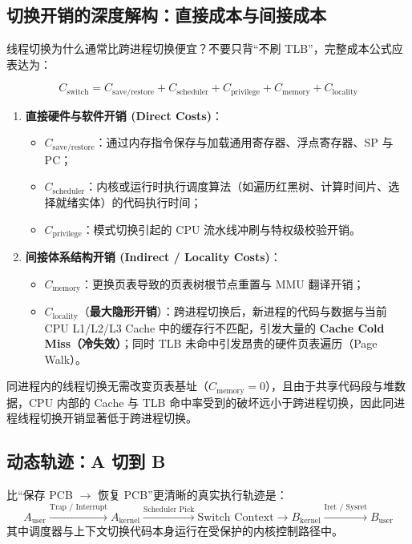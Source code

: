 \documentclass[11pt,a4paper]{ctexart}
\newcommand{\kw}[1]{\textbf{#1}}
\begin{document}
\subsection{切换开销的深度解构：直接成本与间接成本}

线程切换为什么通常比跨进程切换便宜？不要只背“不刷 TLB”，完整成本公式应表达为：

\[
\boxed{
C_{\text{switch}} = C_{\text{save/restore}} + C_{\text{scheduler}} + C_{\text{privilege}} + C_{\text{memory}} + C_{\text{locality}}
}
\]

\begin{enumerate}
\item \kw{直接硬件与软件开销 (Direct Costs)}：
  \begin{itemize}
    \item $C_{\text{save/restore}}$：通过内存指令保存与加载通用寄存器、浮点寄存器、SP 与 PC；
    \item $C_{\text{scheduler}}$：内核或运行时执行调度算法（如遍历红黑树、计算时间片、选择就绪实体）的代码执行时间；
    \item $C_{\text{privilege}}$：模式切换引起的 CPU 流水线冲刷与特权级校验开销。
  \end{itemize}

\item \kw{间接体系结构开销 (Indirect / Locality Costs)}：
  \begin{itemize}
    \item $C_{\text{memory}}$：更换页表导致的页表树根节点重置与 MMU 翻译开销；
    \item $C_{\text{locality}}$（\kw{最大隐形开销}）：跨进程切换后，新进程的代码与数据与当前 CPU L1/L2/L3 Cache 中的缓存行不匹配，引发大量的 \kw{Cache Cold Miss（冷失效）}；同时 TLB 未命中引发昂贵的硬件页表遍历（Page Walk）。
  \end{itemize}
\end{enumerate}

\begin{exam}[408 核心考点定性]
同进程内的线程切换无需改变页表基址（$C_{\text{memory}} = 0$），且由于共享代码段与堆数据，CPU 内部的 Cache 与 TLB 命中率受到的破坏远小于跨进程切换，因此同进程线程切换开销显著低于跨进程切换。
\end{exam}

\subsection{动态轨迹：A 切到 B}

比“保存 PCB $\to$ 恢复 PCB”更清晰的真实执行轨迹是：
\[
A_{\text{user}} \xrightarrow{\text{Trap / Interrupt}} A_{\text{kernel}} \xrightarrow{\text{Scheduler Pick}} \text{Switch Context} \xrightarrow{} B_{\text{kernel}} \xrightarrow{\text{Iret / Sysret}} B_{\text{user}}
\]
其中调度器与上下文切换代码本身运行在受保护的内核控制路径中。
\end{document}
